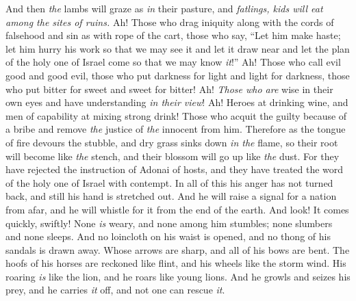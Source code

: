 \begin{biblechapter}
\verse And then \textit{the} lambs will graze as \textit{in} their pasture, 
and \textit{fatlings, kids will eat among the sites of ruins.}
\verse Ah! Those who drag iniquity along with the cords of falsehood 
and sin as with rope of the cart,
\verse those who say, 
“Let him make haste; 
let him hurry his work 
so that we may see it 
and let it draw near 
and let the plan of the holy one of Israel come 
so that we may know \textit{it}!”
\verse Ah! Those who call evil good and good evil, 
those who put darkness for light and light for darkness, 
those who put bitter for sweet and sweet for bitter!
\verse Ah! \textit{Those who are} wise in their own eyes 
and have understanding \textit{in their view}!
\verse Ah! Heroes at drinking wine, 
and men of capability at mixing strong drink!
\verse Those who acquit the guilty because of a bribe 
and remove \textit{the} justice of \textit{the} innocent from him.
\verse Therefore as the tongue of fire devours the stubble, 
and dry grass sinks down \textit{in the} flame, 
so their root will become like \textit{the} stench, 
and their blossom will go up like \textit{the} dust. 
For they have rejected the instruction of Adonai of hosts, 
and they have treated the word of the holy one of Israel with contempt.
 In all of this his anger has not turned back, 
and still his hand is stretched out.
\verse And he will raise a signal for a nation from afar, 
and he will whistle for it from the end of the earth. 
And look! It comes quickly, swiftly!
\verse None \textit{is} weary, 
and none among him stumbles; 
none slumbers and none sleeps. 
And no loincloth on his waist is opened, 
and no thong of his sandals is drawn away.
\verse Whose arrows are sharp, 
and all of his bows are bent. 
The hoofs of his horses are reckoned like flint, 
and his wheels like the storm wind.
\verse His roaring \textit{is} like the lion, 
and he roars like young lions. 
And he growls and seizes his prey, 
and he carries \textit{it} off, 
and not one can rescue \textit{it}.
\end{biblechapter}

